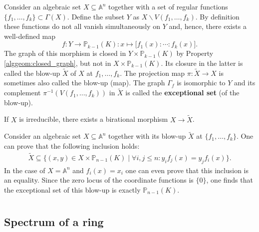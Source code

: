     \begin{construct}[Blow-up]
        Consider an algebraic set $X\subseteq\mathbb{A}^n$ together with a set of regular functions $\{f_1,\ldots,f_k\}\subset\Gamma(X)$. Define the subset $Y$ as $X\backslash V(f_1,\ldots,f_k)$. By definition these functions do not all vanish simultaneously on $Y$ and, hence, there exists a well-defined map \[f:Y\rightarrow \mathbb{P}_{k-1}(K):x\mapsto\Big[f_1(x):\cdots:f_k(x)\Big].\] The graph of this morphism is closed in $Y\times\mathbb{P}_{k-1}(K)$ by Property \ref{alggeom:closed_graph}, but not in $X\times\mathbb{P}_{k-1}(K)$. Its closure in the latter is called the blow-up $\widetilde{X}$ of $X$ at $f_1,\ldots,f_k$. The projection map $\pi:\widetilde{X}\rightarrow X$ is sometimes also called the blow-up (map). The graph $\Gamma_f$ is isomorphic to $Y$ and its complement $\pi^{-1}(V(f_1,\ldots,f_k))$ in $\widetilde{X}$ is called the \textbf{exceptional set} (of the blow-up).

        If $X$ is irreducible, there exists a birational morphism $X\rightarrow\widetilde{X}$.
    \end{construct}
    \begin{property}
        Consider an algebraic set $X\subseteq\mathbb{A}^n$ together with its blow-up $\widetilde{X}$ at $\{f_1,\ldots,f_k\}$. One can prove that the following inclusion holds:
        \begin{gather}
            \widetilde{X}\subseteq\big\{(x,y)\in X\times\mathbb{P}_{n-1}(K)\mid\forall i,j\leq n:y_if_j(x)=y_jf_i(x)\big\}.
        \end{gather}
        In the case of $X=\mathbb{A}^n$ and $f_i(x)=x_i$ one can even prove that this inclusion is an equality. Since the zero locus of the coordinate functions is $\{0\}$, one finds that the exceptional set of this blow-up is exactly $\mathbb{P}_{n-1}(K)$.
    \end{property}

\section{}\label{section:schemes}
\subsection{Spectrum of a ring}


